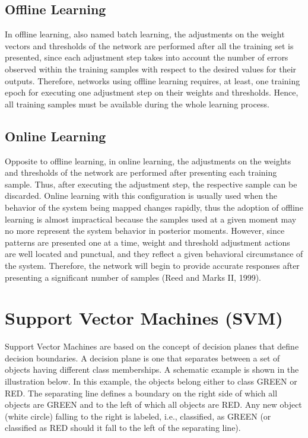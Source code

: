 \subsection{ Offline Learning}
In offline learning, also named batch learning, the adjustments on the weight vectors
and thresholds of the network are performed after all the training set is presented,
since each adjustment step takes into account the number of errors observed within
the training samples with respect to the desired values for their outputs.
Therefore, networks using offline learning requires, at least, one training epoch
for executing one adjustment step on their weights and thresholds. Hence, all
training samples must be available during the whole learning process.

\subsection{ Online Learning }
Opposite to offline learning, in online learning, the adjustments on the weights and
thresholds of the network are performed after presenting each training sample.
Thus, after executing the adjustment step, the respective sample can be discarded.
Online learning with this configuration is usually used when the behavior of the
system being mapped changes rapidly, thus the adoption of offline learning is
almost impractical because the samples used at a given moment may no more
represent the system behavior in posterior moments.
However, since patterns are presented one at a time, weight and threshold
adjustment actions are well located and punctual, and they reflect a given behavioral
circumstance of the system. Therefore, the network will begin to provide accurate
responses after presenting a significant number of samples (Reed and Marks II, 1999).
\section{Support Vector Machines (SVM) }\label{sec:svm}

Support Vector Machines are based on the concept of decision planes that define decision boundaries. A decision plane is one that separates between a set of objects having different class memberships. A schematic example is shown in the illustration below. In this example, the objects belong either to class GREEN or RED. The separating line defines a boundary on the right side of which all objects are GREEN and to the left of which all objects are RED. Any new object (white circle) falling to the right is labeled, i.e., classified, as GREEN (or classified as RED should it fall to the left of the separating line).


